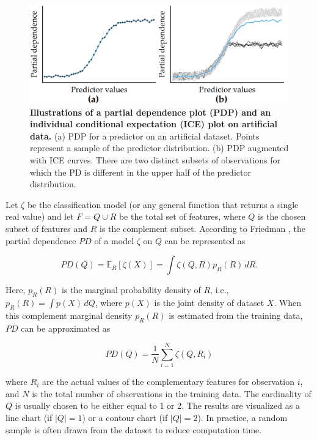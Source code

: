 \documentclass[
  oneside]{book}
\begin{document}
\begin{figure}[htb]

{\centering \includegraphics[width=0.75\linewidth]{figures/08-pd-intro} 

}

\caption{\textbf{Illustrations of a partial dependence plot (PDP) and an individual conditional expectation (ICE) plot on artificial data.} (a) PDP for a predictor on an artificial dataset. Points represent a sample of the predictor distribution. (b) PDP augmented with ICE curves. There are two distinct subsets of observations for which the PD is different in the upper half of the predictor distribution.}\label{fig:08-pd-intro}
\end{figure}

Let \(\zeta\) be the classification model (or any general function that returns a single real value) and let \(F=Q\cup R\) be the total set of features, where \(Q\) is the chosen subset of features and \(R\) is the complement subset.
According to Friedman \autocite{Friedman:PDP2001}, the partial dependence \(PD\) of a model \(\zeta\) on \(Q\) can be represented as

\begin{equation}
PD(Q)=\mathbb{E}_{R}\left[\zeta(X)\right]=\int\zeta(Q,R)p_R(R)\,dR.
\label{eq:pd}
\end{equation}

Here, \(p_R(R)\) is the marginal probability density of \(R\), i.e., \(p_R(R)=\int p(X)\,dQ\), where \(p(X)\) is the joint density of dataset \(X\).
When this complement marginal density \(p_R(R)\) is estimated from the training data, \(PD\) can be approximated as

\begin{equation}
PD(Q)=\frac{1}{N}\sum_{i=1}^N \zeta(Q,R_{i})
\label{eq:pd-approx}
\end{equation}

where \(R_i\) are the actual values of the complementary features for observation \(i\), and \(N\) is the total number of observations in the training data.
The cardinality of \(Q\) is usually chosen to be either equal to 1 or 2.
The results are visualized as a line chart (if \(|Q|=1\)) or a contour chart (if \(|Q|=2\)).
In practice, a random sample is often drawn from the dataset to reduce computation time.
\end{document}
